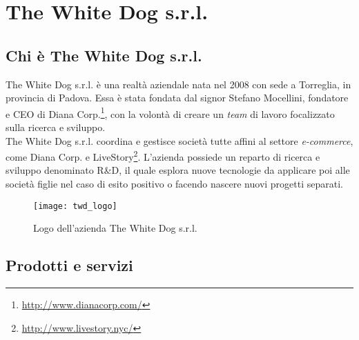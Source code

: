 \newpage
\chapter{The White Dog s.r.l.}
\label{cap:thewhitedog}

\section{Chi è The White Dog s.r.l.}

The White Dog s.r.l. è una realtà aziendale nata nel 2008 con sede a Torreglia, in provincia di Padova. Essa è stata fondata dal signor Stefano Mocellini, fondatore e CEO di Diana Corp.\footnote[1]{\url{http://www.dianacorp.com/}}, con la volontà di creare un \textit{team} di lavoro focalizzato sulla ricerca e sviluppo. \\
The White Dog s.r.l. coordina e gestisce società tutte affini al settore \textit{e-commerce}, come Diana Corp. e LiveStory\footnote[2]{\url{http://www.livestory.nyc/}}. L'azienda possiede un reparto di ricerca e sviluppo denominato R\&D, il quale esplora nuove tecnologie da applicare poi alle società figlie nel caso di esito positivo o facendo nascere nuovi progetti separati.

\label{The White Dog s.r.l.}
\begin{figure}[ht]
	\begin{center}
		\texttt{[image: twd\_logo]}
		\caption{Logo dell'azienda The White Dog s.r.l.}
	\end{center}
\end{figure}
\FloatBarrier

\section{Prodotti e servizi}

